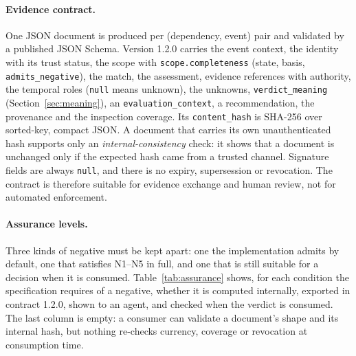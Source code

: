 \documentclass[11pt,a4paper]{article}
\newcommand{\code}[1]{\texttt{#1}}
\begin{document}
\paragraph{Evidence contract.} One JSON document is produced per
(dependency, event) pair and validated by a published JSON Schema.
Version 1.2.0 carries the event context, the identity with its trust
status, the scope with \code{scope.completeness} (state, basis,
\code{admits\_negative}), the match, the assessment, evidence
references with authority, the temporal roles (\code{null} means
unknown), the unknowns, \code{verdict\_meaning}
(Section~\ref{sec:meaning}), an \code{evaluation\_context}, a
recommendation, the provenance and the inspection coverage. Its \code{content\_hash} is
SHA-256 over sorted-key, compact JSON. A document that carries its own
unauthenticated hash supports only an \emph{internal-consistency}
check: it shows that a document is unchanged only if the expected hash
came from a trusted channel. Signature fields are always \code{null},
and there is no expiry, supersession or revocation. The contract is
therefore suitable for evidence exchange and human review, not for
automated enforcement.

\paragraph{Assurance levels.} Three kinds of negative must be kept
apart: one the implementation admits by default, one that satisfies
N1--N5 in full, and one that is still suitable for a decision when it
is consumed. Table~\ref{tab:assurance} shows, for each condition the
specification requires of a negative, whether it is computed
internally, exported in contract 1.2.0, shown to an agent, and checked
when the verdict is consumed. The last column is empty: a consumer can
validate a document's shape and its internal hash, but nothing
re-checks currency, coverage or revocation at consumption time.
\end{document}
